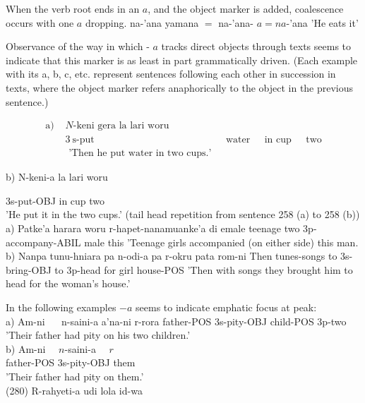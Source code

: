 \documentclass[10pt]{article}
\begin{document}
When the verb root ends in an \(a\), and the object marker is added, coalescence occurs with one \(a\) dropping. na-'ana yamana \(=\) na-'ana- \(a=n a\)-'ana 'He eats it'

Observance of the way in which - \(a\) tracks direct objects through texts seems to indicate that this marker is as least in part grammatically driven. (Each example with its a, b, c, etc. represent sentences following each other in succession in texts, where the object marker refers anaphorically to the object in the previous sentence.)

\[
\begin{array}{lllll}
\text { a) } & N \text {-keni gera la lari woru } \\
& 3 \mathrm{~s} \text {-put } & \text { water } & \text { in cup } & \text { two } \\
& \text { 'Then he put water in two cups.' } &
\end{array}
\]

b) N-keni-a la lari woru

3s-put-OBJ in cup two\\
'He put it in the two cups.' (tail head repetition from sentence 258 (a) to 258 (b))\\
a) Patke'a harara woru r-hapet-nanamuanke'a di emale teenage two 3p-accompany-ABIL male this 'Teenage girls accompanied (on either side) this man.\\
b) Nanpa tunu-hniara pa n-odi-a pa r-okru pata rom-ni Then tunes-songs to 3s-bring-OBJ to 3p-head for girl house-POS 'Then with songs they brought him to head for the woman's house.'

In the following examples \(-a\) seems to indicate emphatic focus at peak:\\
a) Am-ni \(\quad\) n-saini-a a'na-ni r-rora father-POS 3s-pity-OBJ child-POS 3p-two 'Their father had pity on his two children.'\\
b) Am-ni \(\quad n\)-saini-a \(\quad r\)\\
father-POS 3s-pity-OBJ them\\
'Their father had pity on them.'\\
(280) R-rahyeti-a udi lola id-wa
\end{document}
